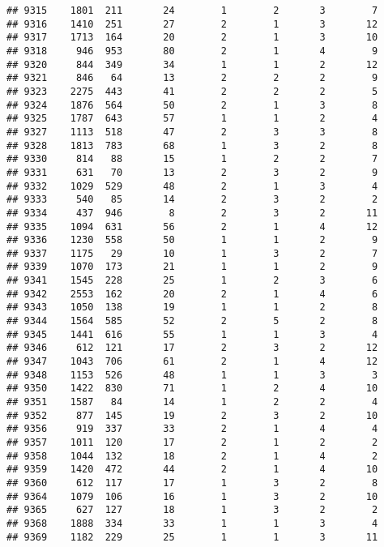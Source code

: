 \documentclass[]{article}
\begin{document}
\begin{verbatim}
## 9315    1801  211       24        1        2       3        7
## 9316    1410  251       27        2        1       3       12
## 9317    1713  164       20        2        1       3       10
## 9318     946  953       80        2        1       4        9
## 9320     844  349       34        1        1       2       12
## 9321     846   64       13        2        2       2        9
## 9323    2275  443       41        2        2       2        5
## 9324    1876  564       50        2        1       3        8
## 9325    1787  643       57        1        1       2        4
## 9327    1113  518       47        2        3       3        8
## 9328    1813  783       68        1        3       2        8
## 9330     814   88       15        1        2       2        7
## 9331     631   70       13        2        3       2        9
## 9332    1029  529       48        2        1       3        4
## 9333     540   85       14        2        3       2        2
## 9334     437  946        8        2        3       2       11
## 9335    1094  631       56        2        1       4       12
## 9336    1230  558       50        1        1       2        9
## 9337    1175   29       10        1        3       2        7
## 9339    1070  173       21        1        1       2        9
## 9341    1545  228       25        1        2       3        6
## 9342    2553  162       20        2        1       4        6
## 9343    1050  138       19        1        1       2        8
## 9344    1564  585       52        2        5       2        8
## 9345    1441  616       55        1        1       3        4
## 9346     612  121       17        2        3       2       12
## 9347    1043  706       61        2        1       4       12
## 9348    1153  526       48        1        1       3        3
## 9350    1422  830       71        1        2       4       10
## 9351    1587   84       14        1        2       2        4
## 9352     877  145       19        2        3       2       10
## 9356     919  337       33        2        1       4        4
## 9357    1011  120       17        2        1       2        2
## 9358    1044  132       18        2        1       4        2
## 9359    1420  472       44        2        1       4       10
## 9360     612  117       17        1        3       2        8
## 9364    1079  106       16        1        3       2       10
## 9365     627  127       18        1        3       2        2
## 9368    1888  334       33        1        1       3        4
## 9369    1182  229       25        1        1       3       11

\end{verbatim}
\end{document}
